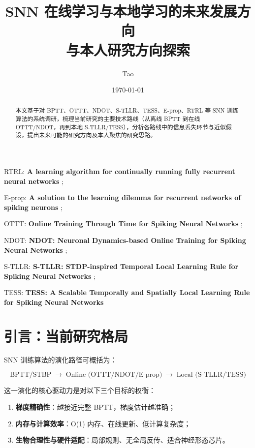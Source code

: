\documentclass[journal,12pt,onecolumn]{IEEEtran}
\begin{document}
\title{SNN 在线学习与本地学习的未来发展方向\\与本人研究方向探索}
\author{Tao}
\date{\today}
\maketitle

\begin{abstract}
本文基于对 BPTT、OTTT、NDOT、S-TLLR、TESS、E-prop、RTRL 等 SNN 训练算法的系统调研，梳理当前研究的主要技术路线（从离线 BPTT 到在线 OTTT/NDOT，再到本地 S-TLLR/TESS），分析各路线中的信息丢失环节与近似假设，提出未来可能的研究方向及本人聚焦的研究思路。
\end{abstract}

RTRL: \textbf{A learning algorithm for continually running fully recurrent neural networks} \cite{williams1989learning};

E-prop: \textbf{A solution to the learning dilemma for recurrent networks of spiking neurons} \cite{bellec_solution_2020};

OTTT: \textbf{Online Training Through Time for Spiking Neural Networks} \cite{xiao_online_2022};

NDOT: \textbf{NDOT: Neuronal Dynamics-based Online Training for Spiking Neural Networks} \cite{jiang_ndot_nodate};

S-TLLR: \textbf{S-TLLR: STDP-inspired Temporal Local Learning Rule for Spiking Neural Networks} \cite{apolinario_s-tllr_2024};

TESS: \textbf{TESS: A Scalable Temporally and Spatially Local Learning Rule for Spiking Neural Networks} \cite{apolinario_tess_2025}

\section{引言：当前研究格局}

SNN 训练算法的演化路径可概括为：

\begin{equation}
\text{BPTT/STBP} \;\rightarrow\; \text{Online (OTTT/NDOT/E-prop)} \;\rightarrow\; \text{Local (S-TLLR/TESS)}
\label{eq.evolution}
\end{equation}

这一演化的核心驱动力是对以下三个目标的权衡：
\begin{enumerate}
    \item \textbf{梯度精确性}：越接近完整 BPTT，梯度估计越准确；
    \item \textbf{内存与计算效率}：O(1) 内存、在线更新、低计算复杂度；
    \item \textbf{生物合理性与硬件适配}：局部规则、无全局反传、适合神经形态芯片。
\end{enumerate}
\end{document}
